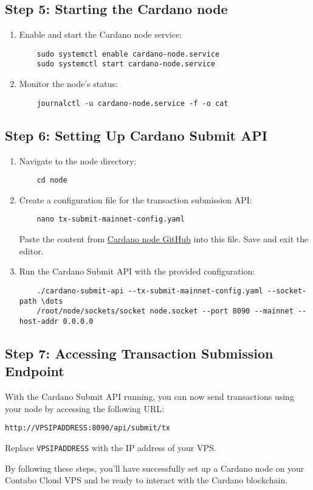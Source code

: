\subsection{Step 5: Starting the Cardano node}
\begin{enumerate}
    \item Enable and start the Cardano node service:
    \begin{verbatim}
    sudo systemctl enable cardano-node.service
    sudo systemctl start cardano-node.service
    \end{verbatim}
    \item Monitor the node's status:
    \begin{verbatim}
    journalctl -u cardano-node.service -f -o cat
    \end{verbatim}
\end{enumerate}

\subsection{Step 6: Setting Up Cardano Submit API}
\begin{enumerate}
    \item Navigate to the node directory:
    \begin{verbatim}
    cd node
    \end{verbatim}
    \item Create a configuration file for the transaction submission API:
    \begin{verbatim}
    nano tx-submit-mainnet-config.yaml
    \end{verbatim}
    Paste the content from \href{https://github.com/input-output-hk/cardano-node/blob/master/cardano-submit-api/config/tx-submit-mainnet-config.yaml}{Cardano node GitHub} into this file. Save and exit the editor.
    \item Run the Cardano Submit API with the provided configuration:
    \begin{verbatim}
    ./cardano-submit-api --tx-submit-mainnet-config.yaml --socket-path \dots
    /root/node/sockets/socket node.socket --port 8090 --mainnet --host-addr 0.0.0.0
    \end{verbatim}
\end{enumerate}

\subsection{Step 7: Accessing Transaction Submission Endpoint}
With the Cardano Submit API running, you can now send transactions using your node by accessing the following URL:
\begin{verbatim}
http://VPSIPADDRESS:8090/api/submit/tx
\end{verbatim}
Replace \texttt{VPSIPADDRESS} with the IP address of your VPS.

By following these steps, you'll have successfully set up a Cardano node on your Contabo Cloud VPS and be ready to interact with the Cardano blockchain.
